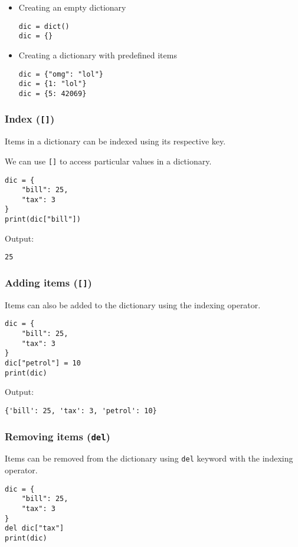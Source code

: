 \documentclass[11pt]{article}
\begin{document}
\begin{itemize}
\item Creating an empty dictionary
\begin{verbatim}
dic = dict()
dic = {}
\end{verbatim}

\item Creating a dictionary with predefined items
\begin{verbatim}
dic = {"omg": "lol"}
dic = {1: "lol"}
dic = {5: 42069}
\end{verbatim}
\end{itemize}

 \newpage
\subsubsection{Index (\texttt{[]})}
\label{sec:orgc5fc8a2}
Items in a dictionary can be indexed using its respective key.

We can use \texttt{[]} to access particular values in a dictionary.
\begin{verbatim}
dic = {
    "bill": 25,
    "tax": 3
}
print(dic["bill"])
\end{verbatim}

 \noindent Output:

\label{orgdfb6ea7}
\begin{verbatim}
25
\end{verbatim}
\subsubsection{Adding items (\texttt{[]})}
\label{sec:org99cdfe4}
Items can also be added to the dictionary using the indexing operator.
\begin{verbatim}
dic = {
    "bill": 25,
    "tax": 3
}
dic["petrol"] = 10
print(dic)
\end{verbatim}

 \noindent Output:

\label{org57856e8}
\begin{verbatim}
{'bill': 25, 'tax': 3, 'petrol': 10}
\end{verbatim}
\subsubsection{Removing items (\texttt{del})}
\label{sec:orgc5f3f5c}
Items can be removed from the dictionary using \texttt{del} keyword with the indexing operator.
\begin{verbatim}
dic = {
    "bill": 25,
    "tax": 3
}
del dic["tax"]
print(dic)
\end{verbatim}
\end{document}
